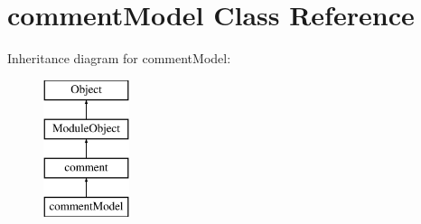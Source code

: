\hypertarget{classcommentModel}{}\section{comment\+Model Class Reference}
\label{classcommentModel}
Inheritance diagram for comment\+Model\+:\begin{figure}[H]
\begin{center}
\leavevmode
\includegraphics[height=4.000000cm]{classcommentModel}
\end{center}
\end{figure}
